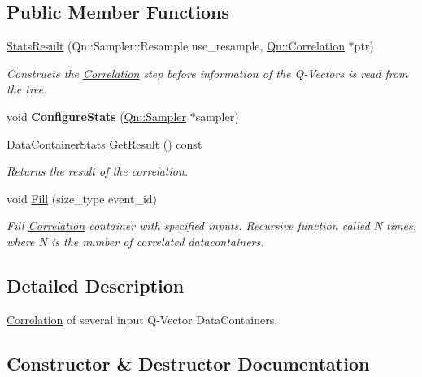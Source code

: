 \subsection*{Public Member Functions}
\begin{DoxyCompactItemize}
\item 
\mbox{\hyperlink{classQn_1_1StatsResult_a15b45cceda2db66fc99175257d676000}{Stats\+Result}} (Qn\+::\+Sampler\+::\+Resample use\+\_\+resample, \mbox{\hyperlink{classQn_1_1Correlation}{Qn\+::\+Correlation}} $\ast$ptr)
\begin{DoxyCompactList}\small\item\em Constructs the \mbox{\hyperlink{classQn_1_1Correlation}{Correlation}} step before information of the Q-\/\+Vectors is read from the tree. \end{DoxyCompactList}\item 
\mbox{\label{classQn_1_1StatsResult_a52fc137eec83120936ba63384a7e8602}} 
void {\bfseries Configure\+Stats} (\mbox{\hyperlink{classQn_1_1Sampler}{Qn\+::\+Sampler}} $\ast$sampler)
\item 
\mbox{\hyperlink{classQn_1_1DataContainer}{Data\+Container\+Stats}} \mbox{\hyperlink{classQn_1_1StatsResult_a6e47628edf1f85496c996cbd7ac884d5}{Get\+Result}} () const
\begin{DoxyCompactList}\small\item\em Returns the result of the correlation. \end{DoxyCompactList}\item 
void \mbox{\hyperlink{classQn_1_1StatsResult_aaa962e50dd135c16ae601f77f653db58}{Fill}} (size\+\_\+type event\+\_\+id)
\begin{DoxyCompactList}\small\item\em Fill \mbox{\hyperlink{classQn_1_1Correlation}{Correlation}} container with specified inputs. Recursive function called N times, where N is the number of correlated datacontainers. \end{DoxyCompactList}\end{DoxyCompactItemize}


\subsection{Detailed Description}
\mbox{\hyperlink{classQn_1_1Correlation}{Correlation}} of several input Q-\/\+Vector Data\+Containers. 

\subsection{Constructor \& Destructor Documentation}
\mbox{\label{classQn_1_1StatsResult_a15b45cceda2db66fc99175257d676000}} 
